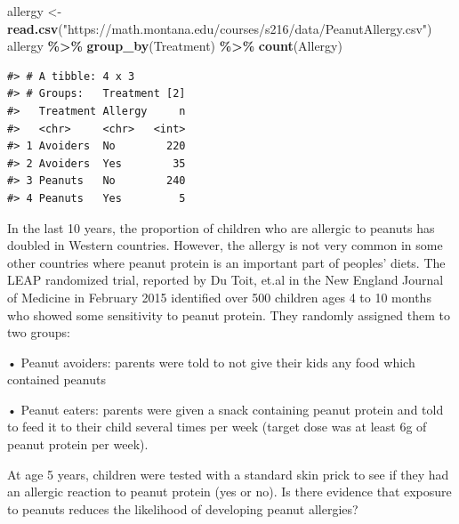 \documentclass[
]{report}
\newenvironment{Shaded}{\begin{snugshade}}{\end{snugshade}}
\newcommand{\FunctionTok}[1]{\textcolor[rgb]{0.13,0.29,0.53}{\textbf{#1}}}
\newcommand{\NormalTok}[1]{#1}
\newcommand{\OtherTok}[1]{\textcolor[rgb]{0.56,0.35,0.01}{#1}}
\newcommand{\SpecialCharTok}[1]{\textcolor[rgb]{0.81,0.36,0.00}{\textbf{#1}}}
\newcommand{\StringTok}[1]{\textcolor[rgb]{0.31,0.60,0.02}{#1}}
\begin{document}
\begin{Shaded}
\begin{Highlighting}[]
\NormalTok{allergy }\OtherTok{\textless{}{-}} \FunctionTok{read.csv}\NormalTok{(}\StringTok{"https://math.montana.edu/courses/s216/data/PeanutAllergy.csv"}\NormalTok{) }
\NormalTok{allergy }\SpecialCharTok{\%\textgreater{}\%} \FunctionTok{group\_by}\NormalTok{(Treatment) }\SpecialCharTok{\%\textgreater{}\%} \FunctionTok{count}\NormalTok{(Allergy)}
\end{Highlighting}
\end{Shaded}

\begin{verbatim}
#> # A tibble: 4 x 3
#> # Groups:   Treatment [2]
#>   Treatment Allergy     n
#>   <chr>     <chr>   <int>
#> 1 Avoiders  No        220
#> 2 Avoiders  Yes        35
#> 3 Peanuts   No        240
#> 4 Peanuts   Yes         5
\end{verbatim}

In the last 10 years, the proportion of children who are allergic to peanuts has doubled in Western countries. However, the allergy is not very common in some other countries where peanut protein is an important part of peoples' diets. The LEAP randomized trial, reported by Du Toit, et.al in the New England Journal of Medicine in February 2015 identified over 500 children ages 4 to 10 months who showed some sensitivity to peanut protein. They randomly assigned them to two groups:

• Peanut avoiders: parents were told to not give their kids any food which contained peanuts

• Peanut eaters: parents were given a snack containing peanut protein and told to feed it to their child several times per week (target dose was at least 6g of peanut protein per week).

At age 5 years, children were tested with a standard skin prick to see if they had an allergic reaction to peanut protein (yes or no). Is there evidence that exposure to peanuts reduces the likelihood of developing peanut allergies?
\end{document}
